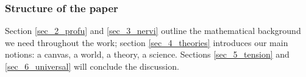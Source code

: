 \subsubsection*{Structure of the paper}
Section \ref{sec_2_profu} and \ref{sec_3_nervi} outline the mathematical background we need throughout the work; section \ref{sec_4_theories} introduces our main notions: a canvas, a world, a theory, a science. Sections \ref{sec_5_tension} and \ref{sec_6_universal} will conclude the discussion.%